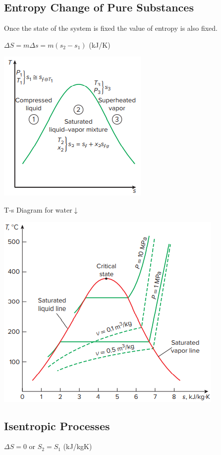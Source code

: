 \documentclass{article}
\begin{document}
\begin{multicols}{3}
    \subsection*{Entropy Change of Pure Substances}
    Once the state of the system is fixed the value of entropy is also fixed.\par 
    $\Delta S=m\Delta s=m(s_2-s_1)$ (kJ/K)\par
    \includegraphics[width=0.5\linewidth]{Images/entropy_pure_subtances.png}\par 
    T-s Diagram for water$\downarrow$\par
    \includegraphics[width=0.5\linewidth]{Images/Ts_water.png}
    \subsection*{Isentropic Processes}
    $\Delta S=0$ or $S_2=S_1$ (kJ/kgK)

\end{multicols}
\end{document}
